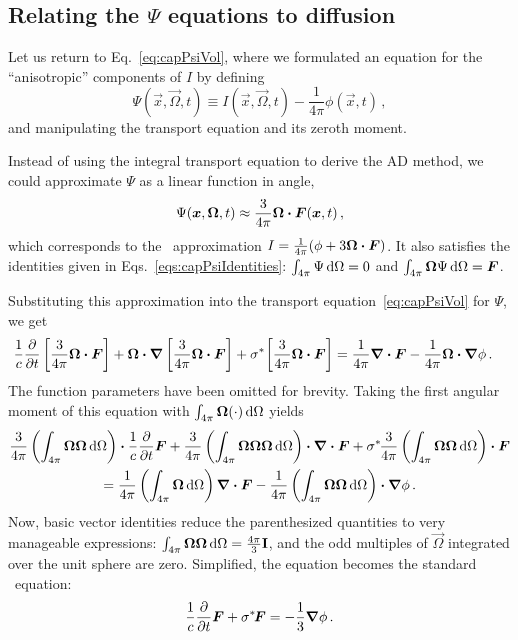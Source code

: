 \subsection{Relating the \texorpdfstring{$\Psi$}{Psi} equations to
diffusion}\label{sec:adDiscDiff}
Let us return to Eq.~\eqref{eq:capPsiVol}, where we formulated an equation for
the ``anisotropic'' components of $I$ by defining
\begin{equation*}
  \Psi(\vec{x}, \vec{\Omega}, t) \equiv I(\vec{x}, \vec{\Omega}, t) -
  \frac{1}{4\pi} \phi(\vec{x}, t)\,,
\end{equation*}
and manipulating the transport equation and its zeroth moment.

Instead of
using the integral transport equation to derive the AD method, we could
approximate $\Psi$
as a linear function in angle,
\begin{equation*}
  \Psi(\bm{x}, \bm{\Omega}, t) \approx \frac{3}{4\pi} \bm{\Omega} \bm{\cdot}
  \bm{F}(\bm{x}, t)\,,
\end{equation*}
which corresponds to the \Pone\ approximation $I= \frac{1}{4\pi} (\phi +
3\bm{\Omega} \bm{\cdot} \bm{F})$. It also satisfies the identities given in
Eqs.~\eqref{eqs:capPsiIdentities}: $\int_{4\pi} \Psi \mathop{}\!\mathrm{d}\Omega = 0$ and
$\int_{4\pi} \bm{\Omega} \Psi \mathop{}\!\mathrm{d}\Omega = \bm{F}$.

Substituting this approximation into the transport equation~\eqref{eq:capPsiVol}
for $\Psi$, we get
\begin{align*}
  \frac{1}{c} \frac{\partial }{\partial t} \left[ \frac{3}{4\pi} \bm{\Omega} \bm{\cdot} \bm{F} \right]
  + \bm{\Omega}\bm{\cdot} \bm{\nabla} \left[ \frac{3}{4\pi} \bm{\Omega} \bm{\cdot} \bm{F} \right]
  + \sigma^{*\!} \left[ \frac{3}{4\pi} \bm{\Omega} \bm{\cdot} \bm{F} \right]
  &= \frac{1}{4\pi} \bm{\nabla} \bm{\cdot}\bm{F}
  - \frac{1}{4\pi} \bm{\Omega}\bm{\cdot} \bm{\nabla} \phi\,.
\end{align*}
The function parameters have been omitted for brevity.
Taking the first angular moment of this equation with $\int_{4\pi}
\bm{\Omega}(\cdot) \mathop{}\!\mathrm{d}\Omega$ yields
\begin{multline*}
\frac{3}{4\pi} \left( \int_{4\pi} \bm{\Omega}\bm{\Omega}\mathop{}\!\mathrm{d}\Omega \right) \bm{\cdot}
\frac{1}{c} \frac{\partial }{\partial t} \bm{F}
+ \frac{3}{4\pi} \left( \int_{4\pi}
  \bm{\Omega}\bm{\Omega}\bm{\Omega}\mathop{}\!\mathrm{d}\Omega \right)
\bm{\cdot} \bm{\nabla} \bm{\cdot} \bm{F}
+ \sigma^{*\!} \frac{3}{4\pi} \left( \int_{4\pi}
\bm{\Omega}\bm{\Omega}\mathop{}\!\mathrm{d}\Omega \right) \bm{\cdot}\bm{F}
\\
= \frac{1}{4\pi} \left( \int_{4\pi} \bm{\Omega}\mathop{}\!\mathrm{d}\Omega \right)
\bm{\nabla} \bm{\cdot}\bm{F}
- \frac{1}{4\pi} \left( \int_{4\pi} \bm{\Omega}\bm{\Omega}\mathop{}\!\mathrm{d}\Omega \right)
\bm{\cdot} \bm{\nabla} \phi\,.
\end{multline*}
Now, basic vector identities \cite{Lar2007} reduce the parenthesized
quantities to very manageable expressions: $\int_{4\pi}
\bm{\Omega}\bm{\Omega}\mathop{}\!\mathrm{d}\Omega=\frac{4\pi}{3}\mathbf{I}$, and the odd
multiples of $\vec{\Omega}$ integrated over the unit sphere are zero. Simplified,
the equation becomes the standard \Pone\ equation:
\begin{equation*}
  \frac{1}{c} \frac{\partial }{\partial t} \bm{F}
  + \sigma^{*\!} \bm{F}
  = - \frac{1}{3} \bm{\nabla} \phi\,.
\end{equation*}

